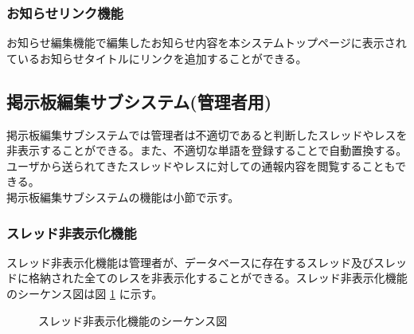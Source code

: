 \documentclass[a4j]{jarticle}
\begin{document}
 \subsubsection{お知らせリンク機能}
   お知らせ編集機能で編集したお知らせ内容を本システムトップページに表示されているお知らせタイトルにリンクを追加することができる。
 \subsection{掲示板編集サブシステム(管理者用)}
 掲示板編集サブシステムでは管理者は不適切であると判断したスレッドやレスを非表示することができる。また、不適切な単語を登録することで自動置換する。ユーザから送られてきたスレッドやレスに対しての通報内容を閲覧することもできる。\\
 掲示板編集サブシステムの機能は小節で示す。
 \subsubsection{スレッド非表示化機能}
 スレッド非表示化機能は管理者が、データベースに存在するスレッド及びスレッドに格納された全てのレスを非表示化することができる。スレッド非表示化機能のシーケンス図は図 \ref{fig:admin_bbs_thread-hide.png} に示す。
              \begin{figure}[H]
\centering
{}
\caption{スレッド非表示化機能のシーケンス図}
\label{fig:admin_bbs_thread-hide.png}
\end{figure}
\end{document}
